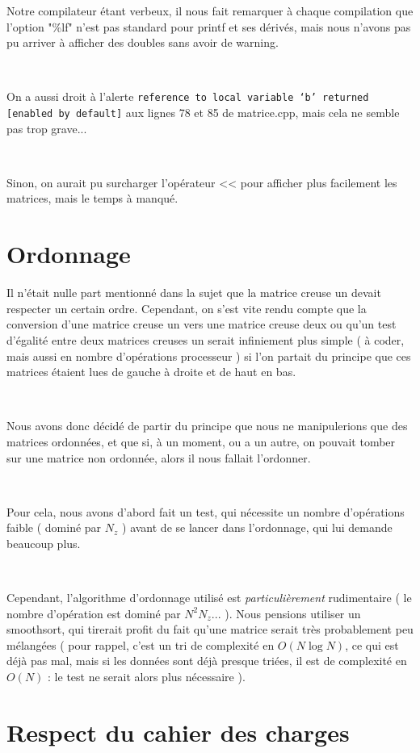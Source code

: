 \documentclass[a4paper]{article}
\begin{document}
Notre compilateur étant verbeux, il nous fait remarquer à chaque compilation que l'option "\%lf" n'est pas standard pour printf et ses dérivés, mais nous n'avons pas pu arriver à afficher des doubles sans avoir de warning.

~

On a aussi droit à l'alerte \verb|reference to local variable ‘b’ returned [enabled by default]| aux lignes 78 et 85 de matrice.cpp, mais cela ne semble pas trop grave...

~

Sinon, on aurait pu surcharger l'opérateur << pour afficher plus facilement les matrices, mais le temps à manqué.

\section{Ordonnage}

Il n'était nulle part mentionné dans la sujet que la matrice creuse un devait respecter un certain ordre. Cependant, on s'est vite rendu compte que la conversion d'une matrice creuse un vers une matrice creuse deux ou qu'un test d'égalité entre deux matrices creuses un serait infiniement plus simple ( à coder, mais aussi en nombre d'opérations processeur ) si l'on partait du principe que ces matrices étaient lues de gauche à droite et de haut en bas.

~

Nous avons donc décidé de partir du principe que nous ne manipulerions que des matrices ordonnées, et que si, à un moment, ou a un autre, on pouvait tomber sur une matrice non ordonnée, alors il nous fallait l'ordonner.

~

Pour cela, nous avons d'abord fait un test, qui nécessite un nombre d'opérations faible ( dominé par $N_z$ ) avant de se lancer dans l'ordonnage, qui lui demande beaucoup plus.

~

Cependant, l'algorithme d'ordonnage utilisé est \emph{particulièrement} rudimentaire ( le nombre d'opération est dominé par $N^2 N_z$... ). Nous pensions utiliser un smoothsort, qui tirerait profit du fait qu'une matrice serait très probablement peu mélangées ( pour rappel, c'est un tri de complexité en $O(N \log N)$, ce qui est déjà pas mal, mais si les données sont déjà presque triées, il est de complexité en $O(N)$ : le test ne serait alors plus nécessaire ).

\section{Respect du cahier des charges}
\end{document}
